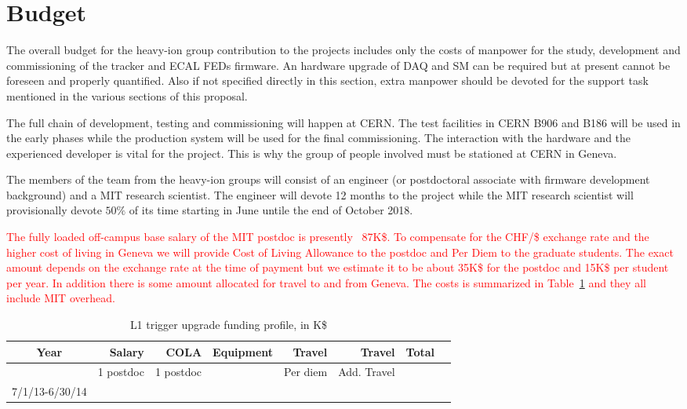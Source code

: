 \section{Budget}
\label{sec:funding}

The overall budget for the heavy-ion group contribution to the projects includes only the costs of manpower for the study, development and commissioning of the tracker and ECAL FEDs firmware. An hardware upgrade of DAQ and SM can be required but at present cannot be foreseen and properly quantified. Also if not specified directly in this section, extra manpower should be devoted for the support task mentioned in the various sections of this proposal. 

The full chain of development, testing and commissioning will happen at CERN. The test facilities in CERN B906 and B186 will be used in the early phases while the production system will be used for the final commissioning. The interaction with the hardware and the experienced developer is vital for the project. This is why the group of people involved must be stationed at CERN in Geneva.

The members of the team from the heavy-ion groups will consist of an engineer (or postdoctoral associate with firmware development background)  and a MIT research scientist. The engineer will devote 12 months to the project while the MIT research scientist will provisionally devote $50\%$ of its time starting in June untile the end of October 2018. 
 
\textcolor{red}{The fully loaded off-campus base salary of the MIT postdoc is presently ~87K\$. To compensate for the CHF/\$ exchange rate and the higher cost of living in Geneva we will provide Cost of Living Allowance to the postdoc and Per Diem to the graduate students. The exact amount depends on the exchange rate at the time of payment but we estimate it to be about 35K\$ for the postdoc and 15K\$ per student per year. In addition there is some amount allocated for travel to and from Geneva. The costs is summarized in Table~\ref{OpCost} and they all include MIT overhead.}

\begin{table}[hbt]
\begin{center}
\begin{tabular}{|c|r|r|r|r|r|r|r|}
\hline
Year        & Salary & COLA & Equipment & Travel & Travel& Total \\ \hline
            &  1 postdoc   & 1 postdoc   &  & Per diem       &  Add. Travel     &     \\ \hline
7/1/13-6/30/14  &     &    &       &   &      &    \\ \hline
\end{tabular}
\end{center}
\caption{L1 trigger upgrade funding profile, in K\$}
\label{OpCost}
\end{table}
